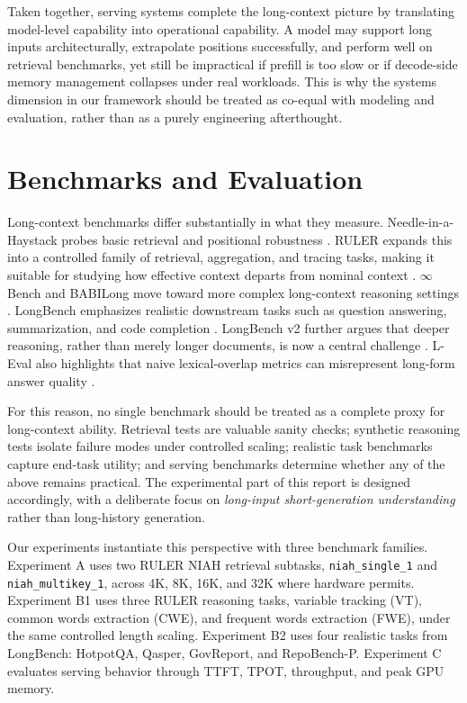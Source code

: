 \documentclass[11pt]{article}
\begin{document}
Taken together, serving systems complete the long-context picture by translating model-level capability into operational capability. A model may support long inputs architecturally, extrapolate positions successfully, and perform well on retrieval benchmarks, yet still be impractical if prefill is too slow or if decode-side memory management collapses under real workloads. This is why the systems dimension in our framework should be treated as co-equal with modeling and evaluation, rather than as a purely engineering afterthought.

\section{Benchmarks and Evaluation}
\label{sec:evaluation}

Long-context benchmarks differ substantially in what they measure. Needle-in-a-Haystack probes basic retrieval and positional robustness \citep{liu2024lost}. RULER expands this into a controlled family of retrieval, aggregation, and tracing tasks, making it suitable for studying how effective context departs from nominal context \citep{hsieh2024ruler}. $\infty$Bench and BABILong move toward more complex long-context reasoning settings \citep{zhang2024infinitebench, kuratov2024babilong}. LongBench emphasizes realistic downstream tasks such as question answering, summarization, and code completion \citep{bai2024longbench}. LongBench v2 further argues that deeper reasoning, rather than merely longer documents, is now a central challenge \citep{bai2025longbenchv2}. L-Eval also highlights that naive lexical-overlap metrics can misrepresent long-form answer quality \citep{an2023leval}.

For this reason, no single benchmark should be treated as a complete proxy for long-context ability. Retrieval tests are valuable sanity checks; synthetic reasoning tests isolate failure modes under controlled scaling; realistic task benchmarks capture end-task utility; and serving benchmarks determine whether any of the above remains practical. The experimental part of this report is designed accordingly, with a deliberate focus on \emph{long-input short-generation understanding} rather than long-history generation.

Our experiments instantiate this perspective with three benchmark families. Experiment A uses two RULER NIAH retrieval subtasks, \texttt{niah\_single\_1} and \texttt{niah\_multikey\_1}, across 4K, 8K, 16K, and 32K where hardware permits. Experiment B1 uses three RULER reasoning tasks, variable tracking (VT), common words extraction (CWE), and frequent words extraction (FWE), under the same controlled length scaling. Experiment B2 uses four realistic tasks from LongBench: HotpotQA, Qasper, GovReport, and RepoBench-P. Experiment C evaluates serving behavior through TTFT, TPOT, throughput, and peak GPU memory.
\end{document}
